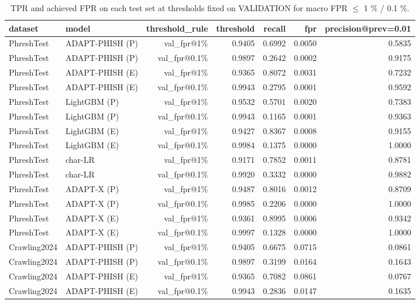 \begin{table}[t]
\centering
\scriptsize
\caption{TPR and achieved FPR on each test set at thresholds fixed on VALIDATION for macro FPR $\leq$ 1 \% / 0.1 \%.}
\label{tab:deploy}
\begin{tabular}{llrrrrr}
\toprule
dataset & model & threshold\_rule & threshold & recall & fpr & precision@prev=0.01 \\
\midrule
PhreshTest & ADAPT-PHISH (P) & val\_fpr@1\% & 0.9405 & 0.6992 & 0.0050 & 0.5835 \\
PhreshTest & ADAPT-PHISH (P) & val\_fpr@0.1\% & 0.9897 & 0.2642 & 0.0002 & 0.9175 \\
PhreshTest & ADAPT-PHISH (E) & val\_fpr@1\% & 0.9365 & 0.8072 & 0.0031 & 0.7232 \\
PhreshTest & ADAPT-PHISH (E) & val\_fpr@0.1\% & 0.9943 & 0.2795 & 0.0001 & 0.9592 \\
PhreshTest & LightGBM (P) & val\_fpr@1\% & 0.9532 & 0.5701 & 0.0020 & 0.7383 \\
PhreshTest & LightGBM (P) & val\_fpr@0.1\% & 0.9943 & 0.1165 & 0.0001 & 0.9363 \\
PhreshTest & LightGBM (E) & val\_fpr@1\% & 0.9427 & 0.8367 & 0.0008 & 0.9155 \\
PhreshTest & LightGBM (E) & val\_fpr@0.1\% & 0.9984 & 0.1375 & 0.0000 & 1.0000 \\
PhreshTest & char-LR & val\_fpr@1\% & 0.9171 & 0.7852 & 0.0011 & 0.8781 \\
PhreshTest & char-LR & val\_fpr@0.1\% & 0.9920 & 0.3332 & 0.0000 & 0.9882 \\
PhreshTest & ADAPT-X (P) & val\_fpr@1\% & 0.9487 & 0.8016 & 0.0012 & 0.8709 \\
PhreshTest & ADAPT-X (P) & val\_fpr@0.1\% & 0.9985 & 0.2206 & 0.0000 & 1.0000 \\
PhreshTest & ADAPT-X (E) & val\_fpr@1\% & 0.9361 & 0.8995 & 0.0006 & 0.9342 \\
PhreshTest & ADAPT-X (E) & val\_fpr@0.1\% & 0.9997 & 0.1328 & 0.0000 & 1.0000 \\
Crawling2024 & ADAPT-PHISH (P) & val\_fpr@1\% & 0.9405 & 0.6675 & 0.0715 & 0.0861 \\
Crawling2024 & ADAPT-PHISH (P) & val\_fpr@0.1\% & 0.9897 & 0.3199 & 0.0164 & 0.1643 \\
Crawling2024 & ADAPT-PHISH (E) & val\_fpr@1\% & 0.9365 & 0.7082 & 0.0861 & 0.0767 \\
Crawling2024 & ADAPT-PHISH (E) & val\_fpr@0.1\% & 0.9943 & 0.2836 & 0.0147 & 0.1635 \\

\end{tabular}
\end{table}
